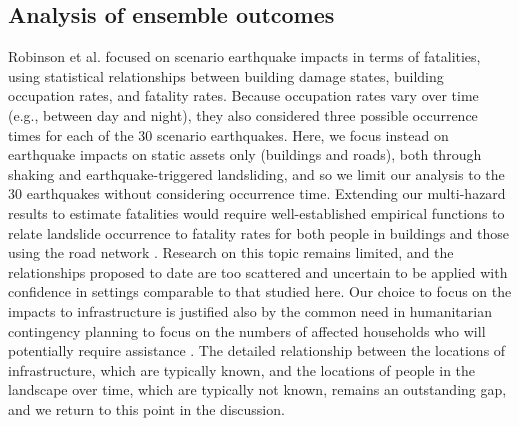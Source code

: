 \documentclass[preprint,12pt,authoryear]{elsarticle}
\begin{document}
\subsection{Analysis of ensemble outcomes}
\label{sec:analysis}

Robinson et al. \citep{Robinson2018} focused on scenario earthquake impacts in terms of fatalities, using statistical relationships between building damage states, building occupation rates, and fatality rates. Because occupation rates vary over time (e.g., between day and night), they also considered three possible occurrence times for each of the 30 scenario earthquakes. Here, we focus instead on earthquake impacts on static assets only (buildings and roads), both through shaking and earthquake-triggered landsliding, and so we limit our analysis to the 30 earthquakes without considering occurrence time. Extending our multi-hazard results to estimate fatalities would require well-established empirical functions to relate landslide occurrence to fatality rates for both people in buildings and those using the road network \citep{VanWykDeVries2024}. Research on this topic remains limited, and the relationships proposed to date \citep{Pollock2020,Luo2023,Hu2024} are too scattered and uncertain to be applied with confidence in settings comparable to that studied here. Our choice to focus on the impacts to infrastructure is justified also by the common need in humanitarian contingency planning to focus on the numbers of affected households who will potentially require assistance \citep{IASC2007,Sijapati2024}. The detailed relationship between the locations of infrastructure, which are typically known, and the locations of people in the landscape over time, which are typically not known, remains an outstanding gap, and we return to this point in the discussion.
\end{document}
